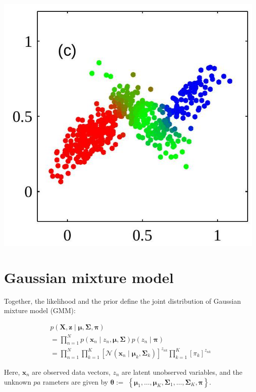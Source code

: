 \documentclass[10pt]{article}
\begin{document}
\begin{center}
\includegraphics[max width=\textwidth]{2023_12_30_0ee90ffe1a149a681222g-3}
\end{center}

\section*{Gaussian mixture model}
Together, the likelihood and the prior define the joint distribution of Gaussian mixture model (GMM):

$$
\begin{aligned}
& p(\mathbf{X}, \mathbf{z} \mid \boldsymbol{\mu}, \boldsymbol{\Sigma}, \boldsymbol{\pi}) \\
& =\prod_{n=1}^{N} p\left(\mathbf{x}_{n} \mid z_{n}, \boldsymbol{\mu}, \boldsymbol{\Sigma}\right) p\left(z_{n} \mid \boldsymbol{\pi}\right) \\
& =\prod_{n=1}^{N} \prod_{k=1}^{K}\left[\mathcal{N}\left(\mathbf{x}_{n} \mid \boldsymbol{\mu}_{k}, \boldsymbol{\Sigma}_{k}\right)\right]^{z_{n k}} \prod_{k=1}^{K}\left[\pi_{k}\right]^{z_{n k}}
\end{aligned}
$$

Here, $\mathbf{x}_{n}$ are observed data vectors, $z_{n}$ are latent unobserved variables, and the unknown $p a$ rameters are given by $\boldsymbol{\theta}:=$ $\left\{\boldsymbol{\mu}_{1}, \ldots, \boldsymbol{\mu}_{K}, \boldsymbol{\Sigma}_{1}, \ldots, \boldsymbol{\Sigma}_{K}, \boldsymbol{\pi}\right\}$.
\end{document}
